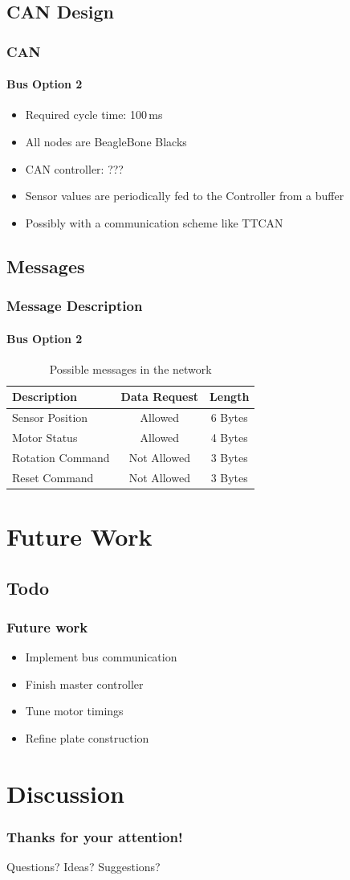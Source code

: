 \documentclass{beamer}
\begin{document}
\subsection{CAN Design}
\begin{frame}
  \frametitle{CAN}
  \framesubtitle{Bus Option 2}
  \begin{itemize}
    \item Required cycle time: 100\,ms
    \item All nodes are BeagleBone Blacks
    \item CAN controller: ???
    \item Sensor values are periodically fed to the Controller from a buffer
    \item Possibly with a communication scheme like TTCAN
  \end{itemize}
\end{frame}

\subsection{Messages}
\begin{frame}
  \frametitle{Message Description}
  \framesubtitle{Bus Option 2}
  \begin{table}
\begin{tabular}{l | c | c }
Description & Data Request & Length \\
\hline \hline
Sensor Position   & Allowed     & 6 Bytes \\
Motor Status      & Allowed     & 4 Bytes \\
Rotation Command  & Not Allowed & 3 Bytes \\
Reset Command     & Not Allowed & 3 Bytes
\end{tabular}
\caption{Possible messages in the network}
\end{table}
\end{frame}

\section{Future Work}
\subsection{Todo}
\begin{frame}
  \frametitle{Future work}
    \begin{itemize}
    \item Implement bus communication
    \item Finish master controller
    \item Tune motor timings
    \item Refine plate construction
  \end{itemize}
\end{frame}

\section{Discussion}
\begin{frame}
  \frametitle{Thanks for your attention!}
  \huge{Questions? Ideas? Suggestions?}
\end{frame}
\end{document}
